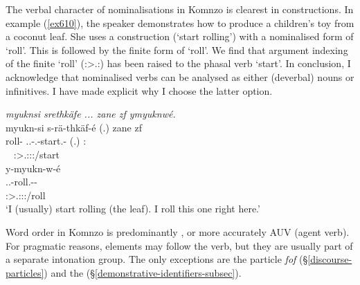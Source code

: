 The verbal character of nominalisations in Komnzo is clearest in  constructions. In example (\ref{ex610}), the speaker demonstrates how to produce a children's toy from a coconut leaf. She uses a  construction (`start rolling') with a nominalised form of `roll'. This is followed by the finite form of `roll'. We find that argument indexing of the finite `roll' (\Fsg:\Sbj>\Tsg.\Masc:\Obj) has been raised to the phasal verb `start'. In conclusion, I acknowledge that nominalised verbs can be analysed as either (deverbal) nouns or infinitives. I have made explicit why I choose the latter option.

\begin{exe}
	\ex \emph{myuknsi srethkäfe ... zane zf ymyuknwé.}\\
	\glll myukn-si s-rä-thkäf-é (.) zane zf\\
	roll-{\Nmlz} \Tsg.\Masc.\Gam-\Irr.\Ndu-start.\Rs-\Fsg{} (.) \Dem:{\Prox} {\Imm} \\
	~ {\footnotesize \Fsg:\Sbj>\Tsg.\Masc:\Obj:\Irr:\Pfv/start} ~ ~ ~ \\
	\sn
	\glll y-myukn-w-é\\
	\Tsg.\Masc.\Alph{}-roll.\Ext-\Ndu-\Fsg{}\\
	{\footnotesize \Fsg:\Sbj>\Tsg.\Masc:\Obj:\Nonpast:\Ipfv/roll}\\
	\trans `I (usually) start rolling (the leaf). I roll this one right here.'
	\label{ex610}
\end{exe}


Word order in Komnzo is predominantly , or more accurately AUV (agent  verb). For pragmatic reasons, elements may follow the verb, but they are usually part of a separate intonation group. The only exceptions are the  particle \textit{fof} ({\S}\ref{discourse-particles}) and the   ({\S}\ref{demonstrative-identifiers-subsec}).

